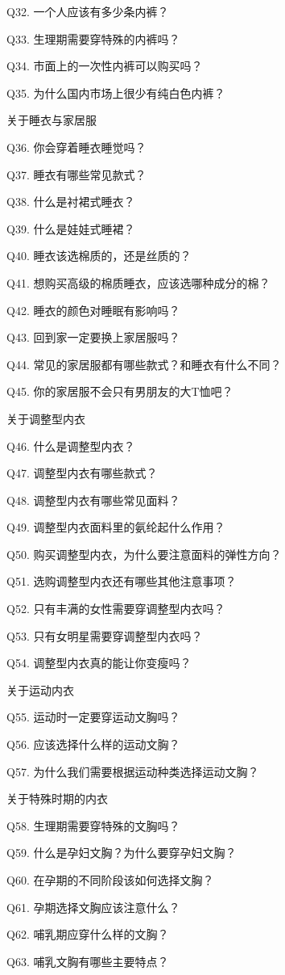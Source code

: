 \documentclass[12pt,UTF8]{ctexbook}
\begin{document}
Q32. 一个人应该有多少条内裤？

Q33. 生理期需要穿特殊的内裤吗？

Q34. 市面上的一次性内裤可以购买吗？

Q35. 为什么国内市场上很少有纯白色内裤？

关于睡衣与家居服

Q36. 你会穿着睡衣睡觉吗？

Q37. 睡衣有哪些常见款式？

Q38. 什么是衬裙式睡衣？

Q39. 什么是娃娃式睡裙？

Q40. 睡衣该选棉质的，还是丝质的？

Q41. 想购买高级的棉质睡衣，应该选哪种成分的棉？

Q42. 睡衣的颜色对睡眠有影响吗？

Q43. 回到家一定要换上家居服吗？

Q44. 常见的家居服都有哪些款式？和睡衣有什么不同？

Q45. 你的家居服不会只有男朋友的大T恤吧？

关于调整型内衣

Q46. 什么是调整型内衣？

Q47. 调整型内衣有哪些款式？

Q48. 调整型内衣有哪些常见面料？

Q49. 调整型内衣面料里的氨纶起什么作用？

Q50. 购买调整型内衣，为什么要注意面料的弹性方向？

Q51. 选购调整型内衣还有哪些其他注意事项？

Q52. 只有丰满的女性需要穿调整型内衣吗？

Q53. 只有女明星需要穿调整型内衣吗？

Q54. 调整型内衣真的能让你变瘦吗？

关于运动内衣

Q55. 运动时一定要穿运动文胸吗？

Q56. 应该选择什么样的运动文胸？

Q57. 为什么我们需要根据运动种类选择运动文胸？

关于特殊时期的内衣

Q58. 生理期需要穿特殊的文胸吗？

Q59. 什么是孕妇文胸？为什么要穿孕妇文胸？

Q60. 在孕期的不同阶段该如何选择文胸？

Q61. 孕期选择文胸应该注意什么？

Q62. 哺乳期应穿什么样的文胸？

Q63. 哺乳文胸有哪些主要特点？
\end{document}

